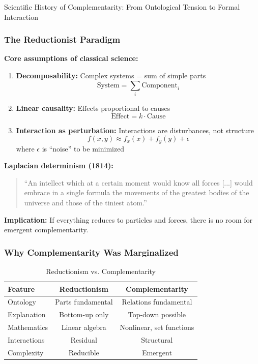\begin{chapter}{Scientific History of Complementarity: From Ontological Tension to Formal Interaction}
\subsubsection{The Reductionist Paradigm}

\textbf{Core assumptions of classical science:}

\begin{enumerate}
    \item \textbf{Decomposability:} Complex systems = sum of simple parts
    \[
    \text{System} = \sum_{i} \text{Component}_i
    \]

    \item \textbf{Linear causality:} Effects proportional to causes
    \[
    \text{Effect} = k \cdot \text{Cause}
    \]

    \item \textbf{Interaction as perturbation:} Interactions are disturbances, not structure
    \[
    f(x,y) \approx f_x(x) + f_y(y) + \epsilon
    \]
    where $\epsilon$ is ``noise'' to be minimized
\end{enumerate}

\textbf{Laplacian determinism (1814):}
\begin{quote}
``An intellect which at a certain moment would know all forces [...] would embrace in a single formula the movements of the greatest bodies of the universe and those of the tiniest atom.''
\end{quote}

\textbf{Implication:} If everything reduces to particles and forces, there is no room for emergent complementarity.

\subsubsection{Why Complementarity Was Marginalized}

\begin{table}[h]
\centering
\caption{Reductionism vs. Complementarity}
\label{tab:reductionism-complementarity}
\renewcommand{\arraystretch}{1.3}
\begin{tabular}{@{}lcc@{}}
\toprule
\textbf{Feature} & \textbf{Reductionism} & \textbf{Complementarity} \\
\midrule
Ontology & Parts fundamental & Relations fundamental \\
Explanation & Bottom-up only & Top-down possible \\
Mathematics & Linear algebra & Nonlinear, set functions \\
Interactions & Residual & Structural \\
Complexity & Reducible & Emergent \\
\bottomrule
\end{tabular}
\end{table}


\end{chapter}
